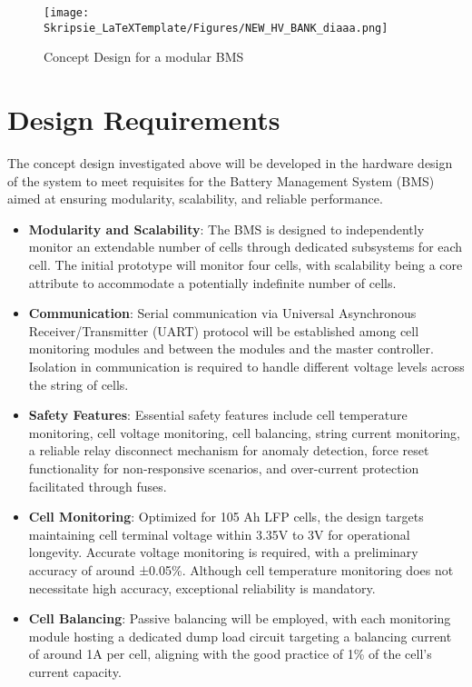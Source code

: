 \begin{figure}[h!]
\centering
\texttt{[image: Skripsie\_LaTeXTemplate/Figures/NEW\_HV\_BANK\_diaaa.png]}
\caption{Concept Design for a modular BMS}
\label{fig:Conventional1}
\end{figure}
\section{Design Requirements}\label{sec:DesignReq}
The concept design investigated above will be developed in the hardware design of the system to meet requisites for the Battery Management System (BMS) aimed at ensuring modularity, scalability, and reliable performance.

\begin{itemize}
    \item \textbf{Modularity and Scalability}: The BMS is designed to independently monitor an extendable number of cells through dedicated subsystems for each cell. The initial prototype will monitor four cells, with scalability being a core attribute to accommodate a potentially indefinite number of cells.
    
    \item \textbf{Communication}: Serial communication via Universal Asynchronous Receiver/Transmitter (UART) protocol will be established among cell monitoring modules and between the modules and the master controller. Isolation in communication is required to handle different voltage levels across the string of cells.
    
    \item \textbf{Safety Features}: Essential safety features include cell temperature monitoring, cell voltage monitoring, cell balancing, string current monitoring, a reliable relay disconnect mechanism for anomaly detection, force reset functionality for non-responsive scenarios, and over-current protection facilitated through fuses.
    
    \item \textbf{Cell Monitoring}: Optimized for 105 Ah LFP cells, the design targets maintaining cell terminal voltage within 3.35V to 3V for operational longevity. Accurate voltage monitoring is required, with a preliminary accuracy of around ±0.05\%. Although cell temperature monitoring does not necessitate high accuracy, exceptional reliability is mandatory.
    
    \item \textbf{Cell Balancing}: Passive balancing will be employed, with each monitoring module hosting a dedicated dump load circuit targeting a balancing current of around 1A per cell, aligning with the good practice of 1\% of the cell's current capacity.
    

\end{itemize}
